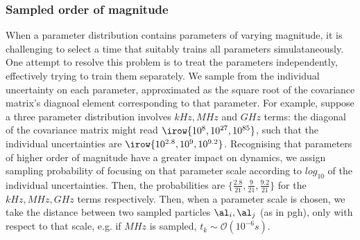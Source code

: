 \subsubsection{Sampled order of magnitude}
When a parameter distribution contains parameters of varying magnitude, 
    it is challenging to select a time that suitably trains all parameters simulataneously. 
One attempt to resolve this problem is to treat the parameters independently, 
    effectively trying to train them separately. 
We sample from the individual uncertainty on each parameter, 
    approximated as the square root of the covariance matrix's diagnoal element 
    corresponding to that parameter. 
For example, suppose a three parameter distribution involves $kHz, MHz$ and $GHz$ terms:
    the diagonal of the covariance matrix might read $\irow{10^{8}, 10^{27}, 10^{85}}$, 
    such that the individual uncertainties are $\irow{10^{2.8}, 10^{9}, 10^{9.2}}$.
Recognising that parameters of higher order of magnitude have a greater impact on dynamics, 
    we assign sampling probability of focusing on that parameter scale according to $log_{10}$ of the individual uncertainties. 
Then, the probabilities are $\{\frac{2.8}{21}, \frac{9}{21}, \frac{9.2}{21} \}$ for the $kHz, MHz, GHz$ terms respectively. 
Then, when a parameter scale is chosen, we take the distance between two sampled \glspl{particle} $\al_i, \al_j$ (as in \gls{pgh}),
    only with respect to that scale, e.g. if $MHz$ is sampled, $t_k \sim \mathcal{O}(10^{-6}s)$.

